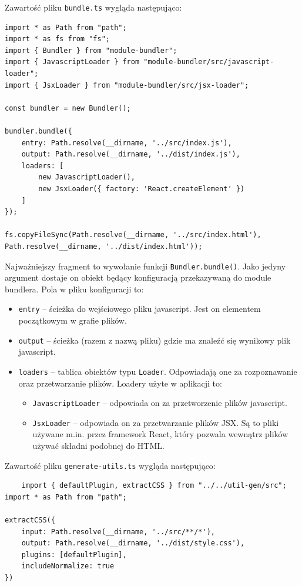 \documentclass{SGGW-thesis}
\begin{document}
Zawartość pliku \verb|bundle.ts| wygląda następująco:

\begin{verbatim}
import * as Path from "path";
import * as fs from "fs";
import { Bundler } from "module-bundler";
import { JavascriptLoader } from "module-bundler/src/javascript-loader";
import { JsxLoader } from "module-bundler/src/jsx-loader";

const bundler = new Bundler();

bundler.bundle({
	entry: Path.resolve(__dirname, '../src/index.js'),
	output: Path.resolve(__dirname, '../dist/index.js'),
	loaders: [
		new JavascriptLoader(),
		new JsxLoader({ factory: 'React.createElement' })
	]
});

fs.copyFileSync(Path.resolve(__dirname, '../src/index.html'), Path.resolve(__dirname, '../dist/index.html'));
\end{verbatim}

Najważniejszy fragment to wywołanie funkcji \verb|Bundler.bundle()|. Jako jedyny argument dostaje on obiekt będący konfiguracją przekazywaną do module bundlera. Pola w pliku konfiguracji to:
\begin{itemize}
    \item \verb|entry| -- ścieżka do wejściowego pliku javascript. Jest on elementem początkowym w grafie plików.
    \item \verb|output| -- ścieżka (razem z nazwą pliku) gdzie ma znaleźć się wynikowy plik javascript.
    \item \verb|loaders| -- tablica obiektów typu \verb|Loader|. Odpowiadają one za rozpoznawanie oraz przetwarzanie plików. Loadery użyte w aplikacji to:
    \begin{itemize}
        \item \verb|JavascriptLoader| -- odpowiada on za przetworzenie plików javascript.
        \item \verb|JsxLoader| -- odpowiada on za przetwarzanie plików JSX. Są to pliki używane m.in. przez framework React, który pozwala wewnątrz plików używać składni podobnej do HTML.
    \end{itemize}
\end{itemize}

Zawartość pliku \verb|generate-utils.ts| wygląda następująco:
\begin{verbatim}
    import { defaultPlugin, extractCSS } from "../../util-gen/src";
import * as Path from "path";

extractCSS({
	input: Path.resolve(__dirname, '../src/**/*'),
	output: Path.resolve(__dirname, '../dist/style.css'),
	plugins: [defaultPlugin],
	includeNormalize: true
})
\end{verbatim}
\end{document}

